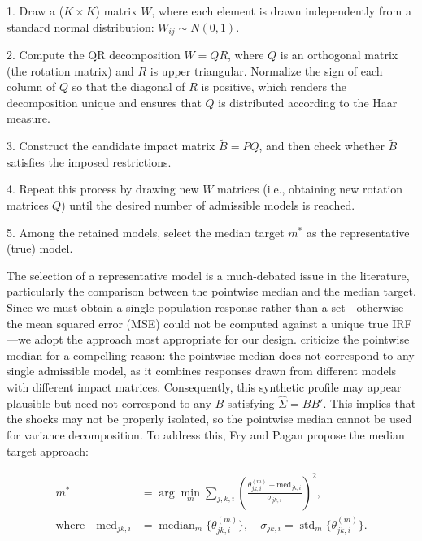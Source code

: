 \documentclass[12pt, a4paper]{article}
\begin{document}
1. Draw a ($K \times K$) matrix $W$, where each element is drawn independently from a standard normal distribution: $W_{ij} \sim N(0,1)$.

2. Compute the QR decomposition $W = QR$, where $Q$ is an orthogonal matrix (the rotation matrix) and $R$ is upper triangular. Normalize the sign of each column of $Q$ so that the diagonal of $R$ is positive, which renders the decomposition unique and ensures that $Q$ is distributed according to the Haar measure.

3. Construct the candidate impact matrix $\tilde B = PQ$, and then check whether $\tilde B$ satisfies the imposed restrictions.

4. Repeat this process by drawing new $W$ matrices (i.e., obtaining new rotation matrices $Q$) until the desired number of admissible models is reached.

5. Among the retained models, select the median target $m^{*}$ as the representative (true) model. 

The selection of a representative model is a much-debated issue in the literature, particularly the comparison between the pointwise median and the median target. Since we must obtain a single population response rather than a set—otherwise the mean squared error (MSE) could not be computed against a unique true IRF—we adopt the approach most appropriate for our design. \citet{frySignRestrictionsStructural2011} criticize the pointwise median for a compelling reason: the pointwise median does not correspond to any single admissible model, as it combines responses drawn from different models with different impact matrices. Consequently, this synthetic profile may appear plausible but need not correspond to any $B$ satisfying $\hat \Sigma = BB'$. This implies that the shocks may not be properly isolated, so the pointwise median cannot be used for variance decomposition. To address this, Fry and Pagan propose the median target approach: 

\begin{equation} \label{eq:Median_Target}
    \begin{aligned} 
        m^* &= \arg\min_m \sum_{j,k,i} \left(\frac{\theta_{jk,i}^{(m)} - \mathrm{med}_{jk,i}}{\sigma_{jk,i}}\right)^2, \\ \text{where}\quad \mathrm{med}_{jk,i} &= \operatorname{median}_m\{\theta_{jk,i}^{(m)}\}, \quad \sigma_{jk,i} = \operatorname{std}_m\{\theta_{jk,i}^{(m)}\}. 
    \end{aligned} 
\end{equation}
\end{document}
